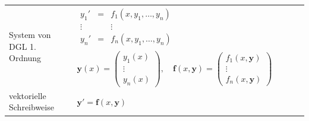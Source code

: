 \begin{tabularx}{\columnwidth}{p{2.8cm}XX}
	System von DGL 1. Ordnung & 
	\multicolumn{2}{p{14cm}}{ $\begin{matrix} y_1' &=& f_1(x,y_1,\dots,y_n) \\ \vdots & &\vdots \\ y_n' &=& f_n(x,y_1,\dots,y_n)\\\end{matrix} \qquad $ 
	$\bm{y}(x) = \left(\begin{matrix} y_1(x) \\ \vdots \\ y_n(x)\end{matrix} \right) , \quad
	\bm{f}(x, \bm y) = \left(\begin{matrix} f_1(x,\bm y) \\ \vdots \\ f_n(x, \bm y)\end{matrix} \right)$}\\
	vektorielle Schreibweise & $\bm y' = \bm f(x,\bm y)$ & \\
	

\end{tabularx}
